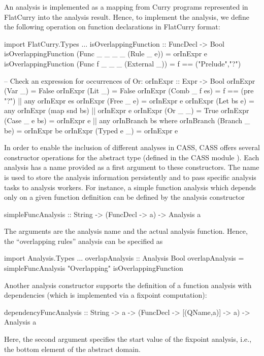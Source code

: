 An analysis is implemented as a mapping from Curry programs
represented in FlatCurry into the analysis result.
Hence, to implement the  analysis, we define
the following operation on function declarations in FlatCurry format:
\begin{curry}
import FlatCurry.Types
$\ldots$
isOverlappingFunction :: FuncDecl -> Bool
isOverlappingFunction (Func _ _ _ _ (Rule _ e))   = orInExpr e
isOverlappingFunction (Func f _ _ _ (External _)) = f == ("Prelude","?")

-- Check an expression for occurrences of Or:
orInExpr :: Expr -> Bool
orInExpr (Var _)       = False
orInExpr (Lit _)       = False
orInExpr (Comb _ f es) = f == (pre "?") || any orInExpr es
orInExpr (Free _ e)    = orInExpr e
orInExpr (Let bs e)    = any orInExpr (map snd bs) || orInExpr e
orInExpr (Or _ _)      = True
orInExpr (Case _ e bs) = orInExpr e || any orInBranch bs
 where orInBranch (Branch _ be) = orInExpr be
orInExpr (Typed e _)   = orInExpr e
\end{curry}
%
In order to enable the inclusion of different analyses in CASS,
CASS offers several constructor operations for the abstract type 
(defined in the CASS module ).
Each analysis has a name provided as a first argument
to these constructors. The name is used to store the
analysis information persistently and to pass specific analysis tasks
to analysis workers.
For instance, a simple function analysis which depends only on a
given function definition can be defined by the
analysis constructor
\begin{curry}
simpleFuncAnalysis :: String -> (FuncDecl -> a) -> Analysis a
\end{curry}
The arguments are the analysis name and the actual analysis function.
Hence, the ``overlapping rules'' analysis can be specified as
\begin{curry}
import Analysis.Types
$\ldots$
overlapAnalysis :: Analysis Bool
overlapAnalysis = simpleFuncAnalysis "Overlapping" isOverlappingFunction
\end{curry}
Another analysis constructor supports the definition
of a function analysis with dependencies (which is implemented via a fixpoint
computation):
\begin{curry}
dependencyFuncAnalysis :: String -> a -> (FuncDecl -> [(QName,a)] -> a)
                       -> Analysis a
\end{curry}
Here, the second argument specifies the start value of the fixpoint analysis,
i.e., the bottom element of the abstract domain.

